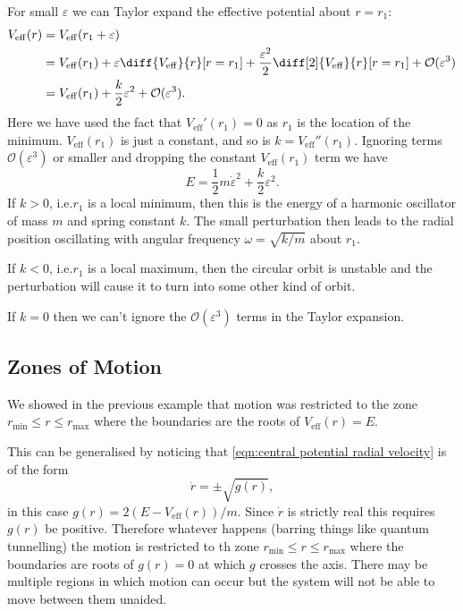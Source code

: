 \documentclass[fleqn]{NotesClass}
\newcommand*{\eff}{\mathrm{eff}}
\newcommand*{\order}{\mathcal{O}}
\begin{document}
    For small \(\varepsilon\) we can Taylor expand the effective potential about \(r = r_1\):
    \begin{align}
        V_\eff(r) &= V_{\eff}(r_1 + \varepsilon)\\
        &= V_\eff(r_1) + \varepsilon\diff{V_{\eff}}{r}[r=r_1] + \frac{\varepsilon^2}{2}\diff[2]{V_{\eff}}{r}[r=r_1] + \order(\varepsilon^3)\\
        &= V_\eff(r_1) + \frac{k}{2}\varepsilon^2 + \order(\varepsilon^3).
    \end{align}
    Here we have used the fact that \(V_\eff'(r_1) = 0\) as \(r_1\) is the location of the minimum.
    \(V_\eff(r_1)\) is just a constant, and so is \(k = V_\eff''(r_1)\).
    Ignoring terms \(\order(\varepsilon^3)\) or smaller and dropping the constant \(V_{\eff}(r_1)\) term we have
    \begin{equation}
        E = \frac{1}{2}m\dot{\varepsilon}^2 + \frac{k}{2}\varepsilon^2.
    \end{equation}
    If \(k > 0\), i.e.\@ \(r_1\) is a local minimum, then this is the energy of a harmonic oscillator of mass \(m\) and spring constant \(k\).
    The small perturbation then leads to the radial position oscillating with angular frequency \(\omega = \sqrt{k/m}\) about \(r_1\).
    
    If \(k < 0\), i.e.\@ \(r_1\) is a local maximum, then the circular orbit is unstable and the perturbation will cause it to turn into some other kind of orbit.
    
    If \(k = 0\) then we can't ignore the \(\order(\varepsilon^3)\) terms in the Taylor expansion.
    
    \subsection{Zones of Motion}
    We showed in the previous example that motion was restricted to the zone \(r_{\mathrm{min}} \le r \le r_{\mathrm{max}}\) where the boundaries are the roots of \(V_{\eff}(r) = E\).
    
    This can be generalised by noticing that \cref{eqn:central potential radial velocity} is of the form
    \begin{equation}
        \dot{r} = \pm \sqrt{g(r)},
    \end{equation}
    in this case \(g(r) = 2(E - V_{\eff}(r))/m\).
    Since \(\dot{r}\) is strictly real this requires \(g(r)\) be positive.
    Therefore whatever happens (barring things like quantum tunnelling) the motion is restricted to th zone \(r_{\mathrm{min}} \le r \le r_{\mathrm{max}}\) where the boundaries are roots of \(g(r) = 0\) at which \(g\) crosses the axis.
    There may be multiple regions in which motion can occur but the system will not be able to move between them unaided.
    
\end{document}
